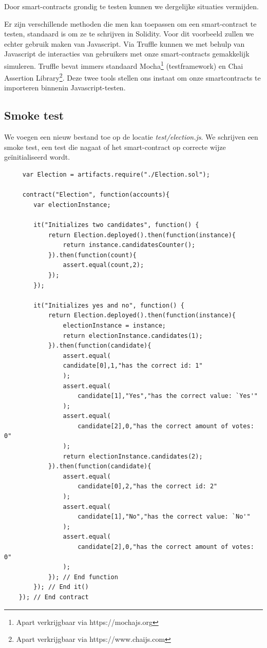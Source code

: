 	Door smart-contracts grondig te testen kunnen we dergelijke situaties vermijden.
	
	Er zijn verschillende methoden die men kan toepassen om een smart-contract te testen, standaard is om ze te schrijven in Solidity. Voor dit voorbeeld zullen we echter gebruik maken van Javascript. Via Truffle kunnen we met behulp van Javascript de  interacties van gebruikers met onze smart-contracts gemakkelijk simuleren. Truffle bevat immers standaard Mocha\footnote{Apart verkrijgbaar via https://mochajs.org} (testframework) en Chai Assertion Library\footnote{Apart verkrijgbaar via https://www.chaijs.com}. Deze twee tools stellen ons instaat om onze smartcontracts te importeren binnenin Javascript-testen. 
	
	
	\subsection{Smoke  test}
	We voegen een nieuw bestand toe op de locatie \textit{test\slash election.js}. We schrijven een smoke test, een test die nagaat of het smart-contract op correcte wijze geïnitialiseerd wordt.

	 \lstset{language=JavaScriptSolidity} 
	 \begin{lstlisting}
	 var Election = artifacts.require("./Election.sol");
	 	
	 contract("Election", function(accounts){
		var electionInstance;
		 
		it("Initializes two candidates", function() {
		 	return Election.deployed().then(function(instance){
		 		return instance.candidatesCounter();
		 	}).then(function(count){
		 		assert.equal(count,2);
		 	});
	 	});
	 	
		it("Initializes yes and no", function() {
	 		return Election.deployed().then(function(instance){
	 			electionInstance = instance;
	 			return electionInstance.candidates(1);
	 		}).then(function(candidate){
				assert.equal(
			 	candidate[0],1,"has the correct id: 1"
			 	);
				assert.equal(
				 	candidate[1],"Yes","has the correct value: `Yes'"
				);
				assert.equal(
				 	candidate[2],0,"has the correct amount of votes: 0"
				);
				return electionInstance.candidates(2);
	 		}).then(function(candidate){
				assert.equal(
					candidate[0],2,"has the correct id: 2"
				);
				assert.equal(
					candidate[1],"No","has the correct value: `No'"
				);
				assert.equal(
					candidate[2],0,"has the correct amount of votes: 0"
				);				
	 		}); // End function
	 	}); // End it()
	}); // End contract
	\end{lstlisting}
	
